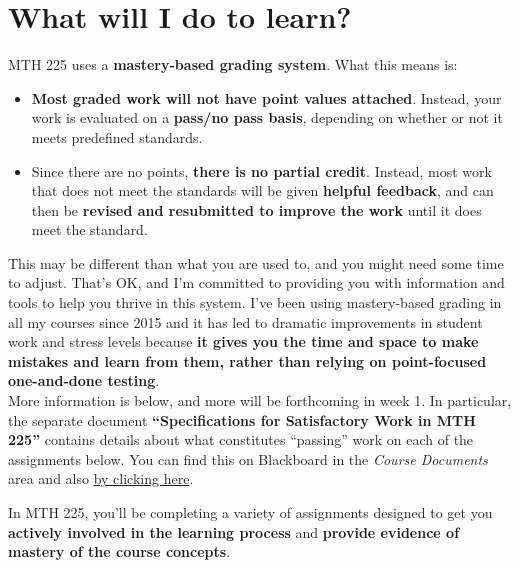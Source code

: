 \documentclass[]{article}
\providecommand{\tightlist}{%
  \setlength{\itemsep}{0pt}\setlength{\parskip}{0pt}}
\begin{document}
\section{What will I do to learn?}

\begin{tcolorbox}[title=About grades and assignments in MTH 225, colback=yellow!15!white]
MTH 225 uses a \textbf{mastery-based grading system}. What this means is: 
\begin{itemize}
\tightlist
    \item \textbf{Most graded work will not have point values attached}. Instead, your work is evaluated on a \textbf{pass/no pass basis}, depending on whether or not it meets predefined standards. 
    \item Since there are no points, \textbf{there is no partial credit}. Instead, most work that does not meet the standards will be given \textbf{helpful feedback}, and can then be \textbf{revised and resubmitted to improve the work} until it does meet the standard. 
\end{itemize}
This may be different than what you are used to, and you might need some time to adjust. That's OK, and I'm committed to providing you with information and tools to help you thrive in this system. I've been using mastery-based grading in all my courses since 2015 and it has led to dramatic improvements in student work and stress levels because \textbf{it gives you the time and space to make mistakes and learn from them, rather than relying on point-focused one-and-done testing}. \\

More information is below, and more will be forthcoming in week 1. In particular, the separate document \textbf{``Specifications for Satisfactory Work in MTH 225''} contains details about what constitutes ``passing'' work on each of the assignments below. You can find this on Blackboard in the \textit{Course Documents} area and also \href{https://hackmd.io/@rtalbert235/SyVUNKrkt}{by clicking here}.
\end{tcolorbox}

In MTH 225, you'll be completing a variety of assignments designed to get you \textbf{actively involved in the learning process} and \textbf{provide evidence of mastery of the course concepts}.
\end{document}
